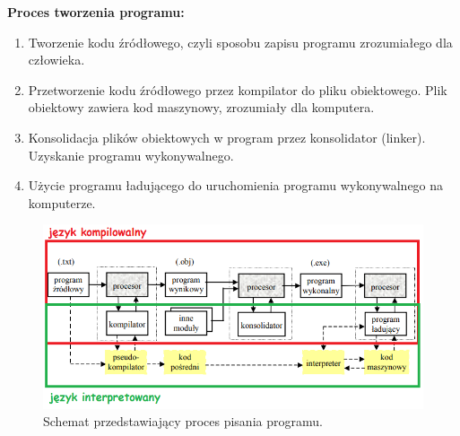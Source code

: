 \documentclass[a4paper,12pt]{article}
\newcommand{\h}[1]{\noindent \bf #1 \rm \\ \noindent}
\begin{document}
\h{Proces tworzenia programu:}
\begin{enumerate}
	\item Tworzenie kodu źródłowego, czyli sposobu zapisu programu zrozumiałego dla człowieka.
	\item Przetworzenie kodu źródłowego przez kompilator do pliku obiektowego. Plik obiektowy zawiera kod maszynowy, zrozumiały dla komputera.
	\item Konsolidacja plików obiektowych w program przez konsolidator (linker). Uzyskanie programu wykonywalnego.
	\item Użycie programu ładującego do uruchomienia programu wykonywalnego na komputerze.
\end{enumerate}

\begin{figure}[H]
	\centering
	\includegraphics[width=15cm]{fig3.png}
	\caption{Schemat przedstawiający proces pisania programu.}
	\label{fig.proces.pisania.programu}
\end{figure}
	
\end{document}
